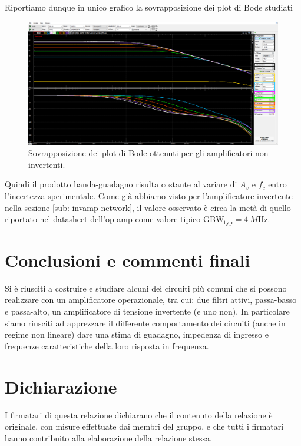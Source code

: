 \documentclass[10pt,a4paper]{article}
\begin{document}
Riportiamo dunque in unico grafico la sovrapposizione dei plot di Bode studiati
\begin{figure}[htbp]
\centering
\includegraphics[scale=0.335]{ampbode}
\caption{Sovrapposizione dei plot di Bode ottenuti per gli amplificatori
non-invertenti. \label{fig: ampbode}}
\end{figure}

Quindi il prodotto banda-guadagno risulta costante al variare di $A_v$ e $f_c$
entro l’incertezza sperimentale. Come già abbiamo visto per l'amplificatore
invertente nella sezione \ref{sub: invamp network}, il valore osservato è
circa la metà di quello riportato nel datasheet dell’op-amp come valore
tipico $\mathrm{GBW_{typ}} = \SI{4}{M\Hz}$.

\section*{Conclusioni e commenti finali}
Si è riusciti a costruire e studiare alcuni dei circuiti più comuni che si
possono realizzare con un amplificatore operazionale, tra cui: due filtri
attivi, passa-basso e passa-alto, un amplificatore di tensione invertente
(e uno non).
In particolare siamo riusciti ad apprezzare il differente comportamento dei
circuiti (anche in regime non lineare) dare una stima di guadagno, impedenza di
ingresso e frequenze caratteristiche della loro risposta in frequenza.

\section*{Dichiarazione}
I firmatari di questa relazione dichiarano che il contenuto della relazione \`e
originale, con misure effettuate dai membri del gruppo, e che tutti i firmatari
hanno contribuito alla elaborazione della relazione stessa.
\end{document}
